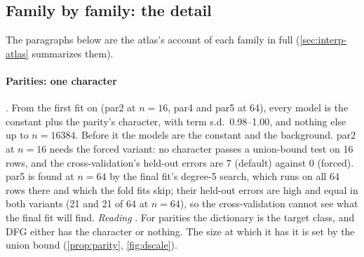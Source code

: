 \begin{table}[tbp]
\centering{\scriptsize\setlength{\tabcolsep}{3pt}\renewcommand{\arraystretch}{0.97}
}
\caption{Every target of the structure atlas: DFG alone, seed 0 . $n^*_0$ ($n^*_3$): the 10\% test-error point of the seed-0 fits (of the seed mean in the result file; 2 seeds for rf06), interpolated in $\log n$. ``Complete'': the first grid $n$ at which some compact representation of the target is complete in the model and, in brackets where it differs, the $n$ from which it stays complete (--: it does not stay complete to $n=16384$). Variant: d = default, f = forced, as DFG's cross-validation chose it. Size: features, the constant included. T / R / S: the shares of target, relevant non-target and spurious terms in the model's output, each the standard deviation of the terms' summed contribution over that of the output; parts that partly cancel can exceed 1. Families as in \cref{tab:interp-atlas}. Source:  and \texttt{atlas\_targets.csv}, via ; the leading terms of every model are in .}
\label{tab:interp-atlas-targets}
\end{table}

\subsection{Family by family: the detail}\label{app:interp-families}

The paragraphs below are the atlas's account of each family in full (\cref{sec:interp-atlas} summarizes them).

\paragraph{Parities: one character} . From the first fit on (par2 at $n=16$, par4 and par5 at 64), every model is the constant plus the parity's character, with term s.d.\ 0.98--1.00, and nothing else up to $n=16384$. Before it the models are the constant and the background. par2 at $n=16$ needs the forced variant: no character passes a union-bound test on 16 rows, and the cross-validation's held-out errors are 7 (default) against 0 (forced). par5 is found at $n=64$ by the final fit's degree-5 search, which runs on all 64 rows there and which the fold fits skip; their held-out errors are high and equal in both variants (21 and 21 of 64 at $n=64$), so the cross-validation cannot see what the final fit will find. \emph{Reading} . For parities the dictionary is the target class, and DFG either has the character or nothing. The size at which it has it is set by the union bound (\cref{prop:parity}, \cref{fig:dscale}).

